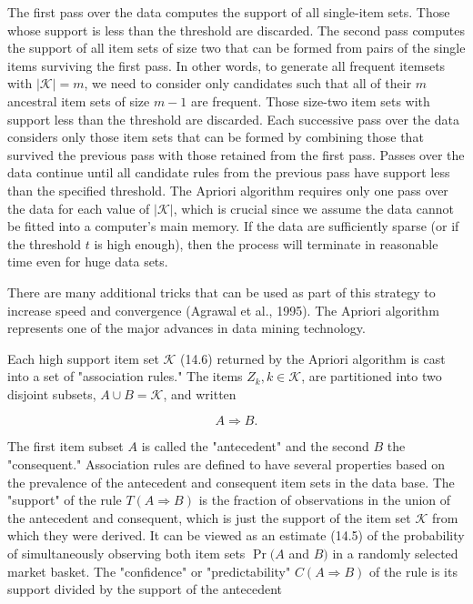 \documentclass[10pt]{article}
\begin{document}
The first pass over the data computes the support of all single-item sets. Those whose support is less than the threshold are discarded. The second pass computes the support of all item sets of size two that can be formed from pairs of the single items surviving the first pass. In other words, to generate all frequent itemsets with $|\mathcal{K}|=m$, we need to consider only candidates such that all of their $m$ ancestral item sets of size $m-1$ are frequent. Those size-two item sets with support less than the threshold are discarded. Each successive pass over the data considers only those item sets that can be formed by combining those that survived the previous pass with those retained from the first pass. Passes over the data continue until all candidate rules from the previous pass have support less than the specified threshold. The Apriori algorithm requires only one pass over the data for each value of $|\mathcal{K}|$, which is crucial since we assume the data cannot be fitted into a computer's main memory. If the data are sufficiently sparse (or if the threshold $t$ is high enough), then the process will terminate in reasonable time even for huge data sets.

There are many additional tricks that can be used as part of this strategy to increase speed and convergence (Agrawal et al., 1995). The Apriori algorithm represents one of the major advances in data mining technology.

Each high support item set $\mathcal{K}$ (14.6) returned by the Apriori algorithm is cast into a set of "association rules." The items $Z_{k}, k \in \mathcal{K}$, are partitioned into two disjoint subsets, $A \cup B=\mathcal{K}$, and written


\begin{equation*}
A \Rightarrow B . \tag{14.7}
\end{equation*}


The first item subset $A$ is called the "antecedent" and the second $B$ the "consequent." Association rules are defined to have several properties based on the prevalence of the antecedent and consequent item sets in the data base. The "support" of the rule $T(A \Rightarrow B)$ is the fraction of observations in the union of the antecedent and consequent, which is just the support of the item set $\mathcal{K}$ from which they were derived. It can be viewed as an estimate (14.5) of the probability of simultaneously observing both item sets $\operatorname{Pr}(A$ and $B)$ in a randomly selected market basket. The "confidence" or "predictability" $C(A \Rightarrow B)$ of the rule is its support divided by the support of the antecedent
\end{document}
